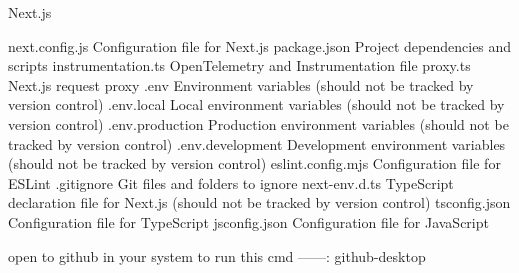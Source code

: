 	
Next.js

next.config.js	              Configuration file for Next.js
package.json	              Project dependencies and scripts
instrumentation.ts	          OpenTelemetry and Instrumentation file
proxy.ts	                  Next.js request proxy
.env	                      Environment variables (should not be tracked by version control)
.env.local	                  Local environment variables (should not be tracked by version control)
.env.production	              Production environment variables (should not be tracked by version control)
.env.development	          Development environment variables (should not be tracked by version control)
eslint.config.mjs	          Configuration file for ESLint
.gitignore	                  Git files and folders to ignore
next-env.d.ts	              TypeScript declaration file for Next.js (should not be tracked by version control)
tsconfig.json	              Configuration file for TypeScript
jsconfig.json	              Configuration file for JavaScript


open to github in your system to run this cmd    ------: github-desktop